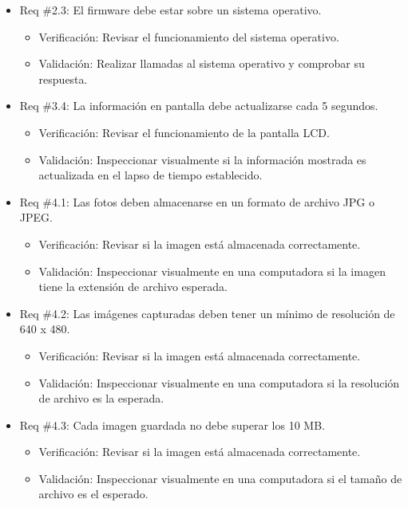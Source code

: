 \documentclass[
11pt, %
]{charter}
\begin{document}
\begin{itemize} 
\item Req \#2.3: El firmware debe estar sobre un sistema operativo.
\begin{itemize}
	\item Verificación: Revisar el funcionamiento del sistema operativo.
	\item Validación: Realizar llamadas al sistema operativo y comprobar su respuesta.
\end{itemize}
\end{itemize}

\begin{itemize} 
\item Req \#3.4: La información en pantalla debe actualizarse cada 5 segundos.
\begin{itemize}
	\item Verificación: Revisar el funcionamiento de la pantalla LCD.
	\item Validación: Inspeccionar visualmente si la información mostrada es actualizada en el lapso de tiempo establecido.
\end{itemize}
\end{itemize}

\begin{itemize} 
\item Req \#4.1: Las fotos deben almacenarse en un formato de archivo JPG o JPEG.
\begin{itemize}
	\item Verificación: Revisar si la imagen está almacenada correctamente.
	\item Validación: Inspeccionar visualmente en una computadora si la imagen tiene la extensión de archivo esperada.
\end{itemize}
\end{itemize}

\begin{itemize} 
\item Req \#4.2: Las imágenes capturadas deben tener un mínimo de resolución de 640 x 480.
\begin{itemize}
	\item Verificación: Revisar si la imagen está almacenada correctamente.
	\item Validación: Inspeccionar visualmente en una computadora si la resolución de archivo es la esperada.
\end{itemize}
\end{itemize}

\begin{itemize} 
\item Req \#4.3: Cada imagen guardada no debe superar los 10 MB.
\begin{itemize}
	\item Verificación: Revisar si la imagen está almacenada correctamente.
	\item Validación: Inspeccionar visualmente en una computadora si el tamaño de archivo es el esperado.
\end{itemize}
\end{itemize}
\end{document}
